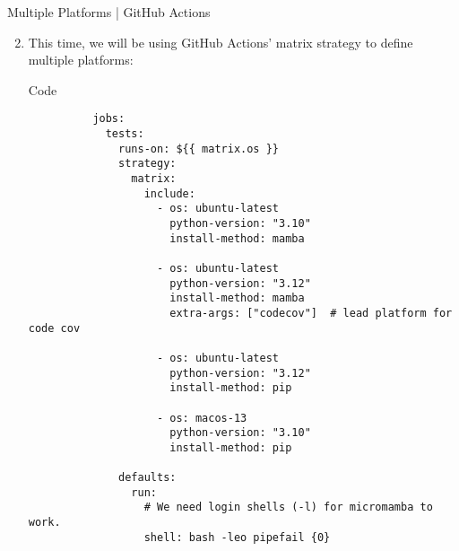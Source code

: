 \begin{frame}[fragile]{
    Multiple Platforms | GitHub Actions
    \hfill
  }
  \begin{enumerate}
    \setcounter{enumi}{1}
    \item This time, we will be using GitHub Actions' matrix strategy to define multiple platforms:
      \begin{block}{Code}
        \scriptsize
        \begin{verbatim}
          jobs:
            tests:
              runs-on: ${{ matrix.os }}
              strategy:
                matrix:
                  include:
                    - os: ubuntu-latest
                      python-version: "3.10"
                      install-method: mamba

                    - os: ubuntu-latest
                      python-version: "3.12"
                      install-method: mamba
                      extra-args: ["codecov"]  # lead platform for code cov

                    - os: ubuntu-latest
                      python-version: "3.12"
                      install-method: pip

                    - os: macos-13
                      python-version: "3.10"
                      install-method: pip

              defaults:
                run:
                  # We need login shells (-l) for micromamba to work.
                  shell: bash -leo pipefail {0}
        \end{verbatim}
      \end{block}
  \end{enumerate}
\end{frame}

